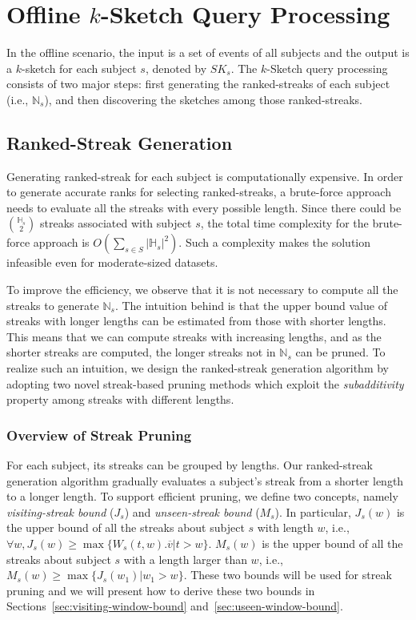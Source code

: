 \section {Offline $k$-Sketch Query Processing}\label{sec:offline}
In the offline scenario, the input is a set of events
of all subjects and the output is a $k$-sketch 
for each subject $s$, denoted by $SK_s$. 
The $k$-Sketch query processing consists of two 
major steps: first generating the ranked-streaks of each subject (i.e., $\mathbb{N}_s$), 
and then discovering the sketches among those ranked-streaks. 

\subsection{Ranked-Streak Generation}
Generating ranked-streak for each subject is computationally 
expensive. %
In order to generate accurate ranks for selecting ranked-streaks, 
a brute-force approach needs to evaluate all the streaks with every possible 
length. %
Since there could be $\mathbb{H}_s \choose 2$ streaks
associated with subject $s$, 
the total time complexity for the brute-force approach
is $O(\sum_{s \in S}|\mathbb{H}_s|^2)$. Such a complexity makes the 
solution infeasible even for moderate-sized datasets.

To improve the efficiency, 
we observe that it is not necessary to 
compute all the streaks to generate $\mathbb{N}_s$.
The intuition behind is that the upper bound value of streaks with longer lengths can be estimated from those
with shorter lengths. This means that we can compute streaks 
with increasing lengths, and as the shorter streaks are computed, 
the longer streaks not in $\mathbb{N}_s$ can be pruned.
To realize such an intuition, we design the ranked-streak generation algorithm
by adopting two novel streak-based pruning methods which 
exploit the \emph{subadditivity} property among streaks with different lengths.


\subsubsection{Overview of Streak Pruning}
For each subject, its streaks can be grouped by lengths. Our ranked-streak
generation algorithm gradually evaluates a subject's streak from a shorter
length to a longer length. To support efficient pruning, 
we define two concepts, namely \emph{visiting-streak bound} ($J_s$) and \emph{unseen-streak bound} ($M_s$).
In particular, $J_s(w)$ is the upper bound of all the streaks about subject $s$ with length $w$, i.e., $\forall w,J_s(w) \geq \max\{W_s(t,w).\overline{v} | t > w\}$. 
$M_s(w)$ is the upper bound of all the streaks about subject $s$ with a length larger than $w$, i.e., $M_s(w) \geq \max\{J_s(w_1) | w_1 > w\}$.  These two bounds will be used for streak pruning and we will present how to derive these two  bounds in Sections~\ref{sec:visiting-window-bound} and~\ref{sec:useen-window-bound}.

